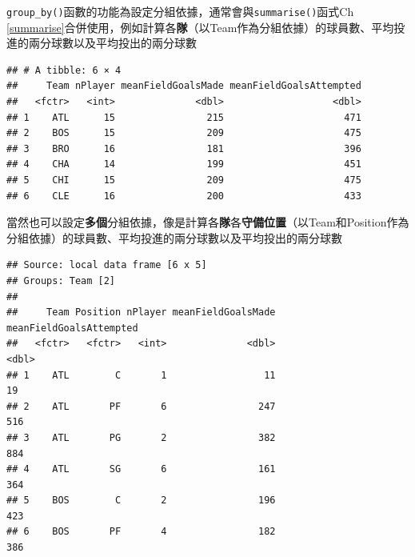 \documentclass[]{book}
\newenvironment{Shaded}{\begin{snugshade}}{\end{snugshade}}
\newcommand{\KeywordTok}[1]{\textcolor[rgb]{0.13,0.29,0.53}{\textbf{{#1}}}}
\newcommand{\DataTypeTok}[1]{\textcolor[rgb]{0.13,0.29,0.53}{{#1}}}
\newcommand{\StringTok}[1]{\textcolor[rgb]{0.31,0.60,0.02}{{#1}}}
\newcommand{\NormalTok}[1]{{#1}}
\theoremstyle{definition}
\theoremstyle{definition}
\theoremstyle{remark}
\begin{document}
\texttt{group\_by()}函數的功能為設定分組依據，通常會與\texttt{summarise()}函式Ch
\ref{summarise}合併使用，例如計算各\textbf{隊}（以Team作為分組依據）的球員數、平均投進的兩分球數以及平均投出的兩分球數

\begin{Shaded}
\end{Shaded}

\begin{verbatim}
## # A tibble: 6 × 4
##     Team nPlayer meanFieldGoalsMade meanFieldGoalsAttempted
##   <fctr>   <int>              <dbl>                   <dbl>
## 1    ATL      15                215                     471
## 2    BOS      15                209                     475
## 3    BRO      16                181                     396
## 4    CHA      14                199                     451
## 5    CHI      15                209                     475
## 6    CLE      16                200                     433
\end{verbatim}

當然也可以設定\textbf{多個}分組依據，像是計算各\textbf{隊}各\textbf{守備位置}（以Team和Position作為分組依據）的球員數、平均投進的兩分球數以及平均投出的兩分球數

\begin{Shaded}
\end{Shaded}

\begin{verbatim}
## Source: local data frame [6 x 5]
## Groups: Team [2]
## 
##     Team Position nPlayer meanFieldGoalsMade meanFieldGoalsAttempted
##   <fctr>   <fctr>   <int>              <dbl>                   <dbl>
## 1    ATL        C       1                 11                      19
## 2    ATL       PF       6                247                     516
## 3    ATL       PG       2                382                     884
## 4    ATL       SG       6                161                     364
## 5    BOS        C       2                196                     423
## 6    BOS       PF       4                182                     386
\end{verbatim}
\end{document}
